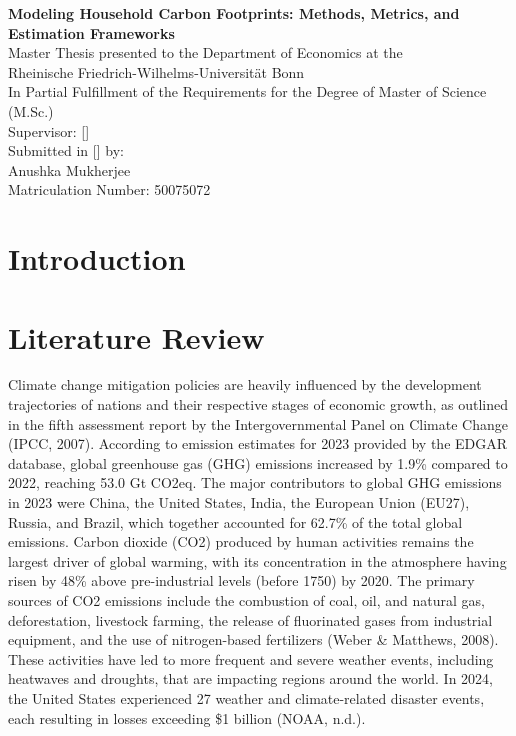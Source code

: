 \documentclass[12pt,a4paper]{article}%
\begin{document}
\begin{titlepage}
  \centering
  \vspace*{5cm}
  {\Huge \textbf{Modeling Household Carbon Footprints: Methods, Metrics, and Estimation Frameworks}}\\[2cm]
  {\large Master Thesis presented to the Department of Economics at the}\\
  {\large Rheinische Friedrich-Wilhelms-Universität Bonn}\\[1cm]
  {\large In Partial Fulfillment of the Requirements for the Degree of Master of Science (M.Sc.)}\\[2cm]
  Supervisor: [] \\[0.5cm]
  Submitted in [] by: \\[0.2cm]
  Anushka Mukherjee \\[0.2cm]
  Matriculation Number: 50075072
  \vfill
\end{titlepage}

\tableofcontents
\thispagestyle{empty}
\newpage

\setcounter{page}{1}


\section{Introduction}
\lipsum[1-2] %

\section{Literature Review}
Climate change mitigation policies are heavily influenced by the development trajectories of nations and their respective stages of economic growth, as outlined in the fifth assessment report by the Intergovernmental Panel on Climate Change (IPCC, 2007). According to emission estimates for 2023 provided by the EDGAR database, global greenhouse gas (GHG) emissions increased by 1.9\% compared to 2022, reaching 53.0 Gt CO2eq. The major contributors to global GHG emissions in 2023 were China, the United States, India, the European Union (EU27), Russia, and Brazil, which together accounted for 62.7\% of the total global emissions. Carbon dioxide (CO2) produced by human activities remains the largest driver of global warming, with its concentration in the atmosphere having risen by 48\% above pre-industrial levels (before 1750) by 2020. The primary sources of CO2 emissions include the combustion of coal, oil, and natural gas, deforestation, livestock farming, the release of fluorinated gases from industrial equipment, and the use of nitrogen-based fertilizers (Weber \& Matthews, 2008). These activities have led to more frequent and severe weather events, including heatwaves and droughts, that are impacting regions around the world. In 2024, the United States experienced 27 weather and climate-related disaster events, each resulting in losses exceeding \$1 billion (NOAA, n.d.).
\end{document}

